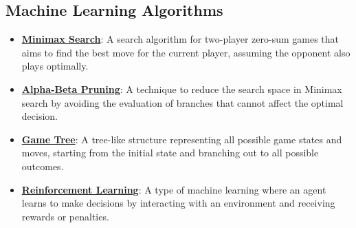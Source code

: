 \documentclass{article}%
\begin{document}
%
\subsection{Machine Learning Algorithms}%
\label{subsec:MachineLearningAlgorithms}%
\begin{itemize}[leftmargin=*]%
\item \href{https://purdue.brightspace.com/d2l/common/assets/pdfjs-d2l-dist/1.0.14-legacy/web/viewer.html?file=%2Fcontent%2Fenforced%2F1095467-wl.202510.CS.24300.001%2F02L2-Intro.pdf%3Fou%3D1095467&lang=en-us&container=d2l-fileviewer-rendered-pdf&fullscreen=d2l-fileviewer-rendered-pdf-dialog&height=667#page=22}{\textbf{Minimax Search}}: A search algorithm for two-player zero-sum games that aims to find the best move for the current player, assuming the opponent also plays optimally.%
\item \href{https://purdue.brightspace.com/d2l/common/assets/pdfjs-d2l-dist/1.0.14-legacy/web/viewer.html?file=%2Fcontent%2Fenforced%2F1095467-wl.202510.CS.24300.001%2F02L2-Intro.pdf%3Fou%3D1095467&lang=en-us&container=d2l-fileviewer-rendered-pdf&fullscreen=d2l-fileviewer-rendered-pdf-dialog&height=667#page=23}{\textbf{Alpha-Beta Pruning}}: A technique to reduce the search space in Minimax search by avoiding the evaluation of branches that cannot affect the optimal decision.%
\item \href{https://purdue.brightspace.com/d2l/common/assets/pdfjs-d2l-dist/1.0.14-legacy/web/viewer.html?file=%2Fcontent%2Fenforced%2F1095467-wl.202510.CS.24300.001%2F02L2-Intro.pdf%3Fou%3D1095467&lang=en-us&container=d2l-fileviewer-rendered-pdf&fullscreen=d2l-fileviewer-rendered-pdf-dialog&height=667#page=11}{\textbf{Game Tree}}: A tree-like structure representing all possible game states and moves, starting from the initial state and branching out to all possible outcomes.%
\item \href{https://purdue.brightspace.com/d2l/common/assets/pdfjs-d2l-dist/1.0.14-legacy/web/viewer.html?file=%2Fcontent%2Fenforced%2F1095467-wl.202510.CS.24300.001%2F02L2-Intro.pdf%3Fou%3D1095467&lang=en-us&container=d2l-fileviewer-rendered-pdf&fullscreen=d2l-fileviewer-rendered-pdf-dialog&height=667#page=46}{\textbf{Reinforcement Learning}}: A type of machine learning where an agent learns to make decisions by interacting with an environment and receiving rewards or penalties.%
\end{itemize}

%
\end{document}
